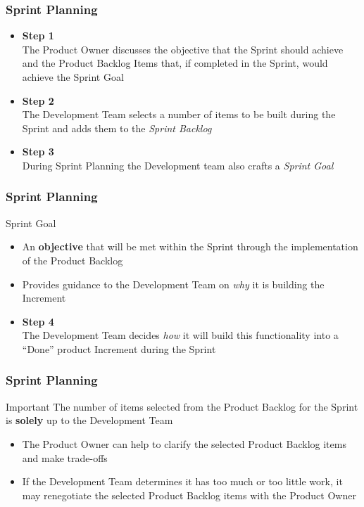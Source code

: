 \begin{frame}
    \frametitle{Sprint Planning}
    \begin{itemize}
        \setlength\itemsep{0.7em}
        \item<1-> \textbf{Step 1}\\
        The Product Owner discusses the objective that the Sprint should achieve and the Product Backlog Items that, if completed in the Sprint, would achieve the Sprint Goal
        \item<2-> \textbf{Step 2}\\
        The Development Team selects a number of items to be built during the Sprint and adds them to the \textit{Sprint Backlog}
        \item<3-> \textbf{Step 3}\\
        During Sprint Planning the Development team also crafts a \textit{Sprint Goal}
    \end{itemize}
\end{frame}

\begin{frame}
    \frametitle{Sprint Planning}
    \begin{block}{Sprint Goal}
        \begin{itemize}
            \setlength\itemsep{0.7em}
            \item An \textbf{objective} that will be met within the Sprint through the implementation of the Product Backlog
            \item Provides guidance to the Development Team on \textit{why} it is building the Increment
        \end{itemize}
    \end{block}
    \vspace{1em}
    \begin{itemize}
        \setlength\itemsep{0.7em}
        \item<2-> \textbf{Step 4}\\
        The Development Team decides \textit{how} it will build this functionality into a ``Done'' product Increment during the Sprint
    \end{itemize}
\end{frame}
    
\begin{frame}
    \frametitle{Sprint Planning}
    \begin{alertblock}{Important}
        The number of items selected from the Product Backlog for the Sprint is \textbf{solely} up to the Development Team
    \end{alertblock}
    \vspace{1em}
    \begin{itemize}
        \setlength\itemsep{0.7em}
        \item<2-> The Product Owner can help to clarify the selected Product Backlog items and make trade-offs
        \item<2-> If the Development Team determines it has too much or too little work, it may renegotiate the selected Product Backlog items with the Product Owner
    \end{itemize}
\end{frame}

